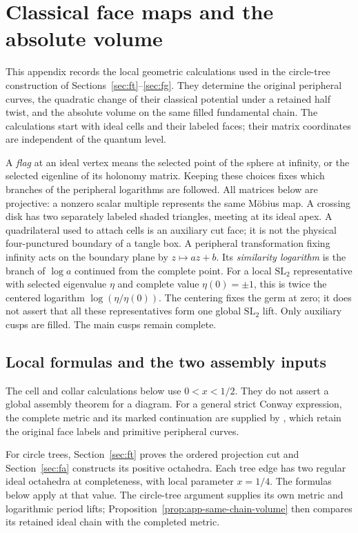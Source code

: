 \chapter{Classical face maps and the absolute volume}
\label{app:marked-calibration}

This appendix records the local geometric calculations used in the
circle-tree construction of Sections~\ref{sec:ft}--\ref{sec:fg}. They determine the
original peripheral curves, the quadratic change of their classical
potential under a retained half twist, and the absolute volume on the
same filled fundamental chain. The calculations start with ideal cells
and their labeled faces; their matrix coordinates are independent of
the quantum level.

A \emph{flag} at an ideal vertex means the selected point of the
sphere at infinity, or the selected eigenline of its holonomy matrix.
Keeping these choices fixes which branches of the peripheral logarithms
are followed. All matrices below are projective: a nonzero scalar multiple represents
the same M\"obius map. A crossing disk has two separately labeled shaded
triangles, meeting at its ideal apex. A quadrilateral used to attach
cells is an auxiliary cut face; it is not the physical four-punctured
boundary of a tangle box. A peripheral transformation fixing infinity acts on the boundary
plane by $z\mapsto az+b$. Its \emph{similarity logarithm} is the branch
of $\log a$ continued from the complete point. For a local $\mathrm{SL}_2$ representative with selected eigenvalue
$\eta$ and complete value $\eta(0)=\pm1$, this is twice the centered
logarithm $\log(\eta/\eta(0))$. The centering fixes the germ at zero;
it does not assert that all these representatives form one global
$\mathrm{SL}_2$ lift.
Only auxiliary cusps are filled. The main cusps remain complete.

\section{Local formulas and the two assembly inputs}

The cell and collar calculations below use \(0<x<1/2\). They do not
assert a global assembly theorem for a diagram. For a general strict
Conway expression, the complete metric and its marked continuation are
supplied by \cite[Theorems~1.2 and~1.3]{StrictGeometry}, which retain
the original face labels and primitive peripheral curves.

For circle trees, Section~\ref{sec:ft} proves the ordered projection
cut and Section~\ref{sec:fa} constructs its positive octahedra. Each
tree edge has two regular ideal octahedra at completeness, with local
parameter \(x=1/4\). The formulas below apply at that value. The
circle-tree argument supplies its own metric and logarithmic period
lifts; Proposition~\ref{prop:app-same-chain-volume} then compares its
retained ideal chain with the completed metric.

